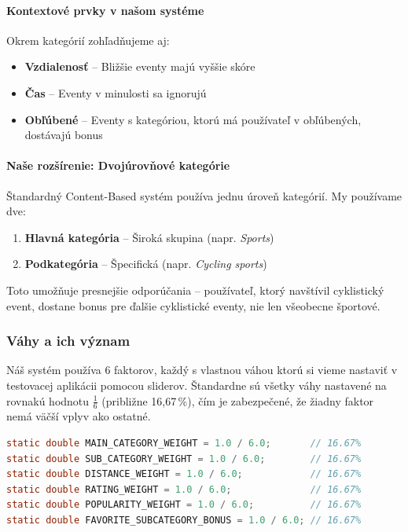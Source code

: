 \paragraph{Kontextové prvky v našom systéme}

Okrem kategórií zohľadňujeme aj:

\begin{itemize}
    \item \textbf{Vzdialenosť} -- Bližšie eventy majú vyššie skóre
    \item \textbf{Čas} -- Eventy v minulosti sa ignorujú
    \item \textbf{Obľúbené} -- Eventy s kategóriou, ktorú má používateľ v obľúbených, dostávajú bonus
\end{itemize}

\paragraph{Naše rozšírenie: Dvojúrovňové kategórie}

Štandardný Content-Based systém používa jednu úroveň kategórií. My používame dve:

\begin{enumerate}
    \item \textbf{Hlavná kategória} -- Široká skupina (napr. \textit{Sports})
    \item \textbf{Podkategória} -- Špecifická (napr. \textit{Cycling sports})
\end{enumerate}

Toto umožňuje presnejšie odporúčania -- používateľ, ktorý navštívil cyklistický event, dostane bonus pre ďalšie cyklistické eventy, nie len všeobecne športové.

\subsubsection{Váhy a ich význam}

Náš systém používa 6 faktorov, každý s vlastnou váhou ktorú si vieme nastaviť v testovacej aplikácii pomocou sliderov. Štandardne sú všetky váhy nastavené na rovnakú hodnotu $\frac{1}{6}$ (približne 16,67\,\%), čím je zabezpečené, že žiadny faktor nemá väčší vplyv ako ostatné.

\begin{lstlisting}[language=Java, caption=Definícia váh s defaultnými hodnotami]
static double MAIN_CATEGORY_WEIGHT = 1.0 / 6.0;       // 16.67%
static double SUB_CATEGORY_WEIGHT = 1.0 / 6.0;        // 16.67%
static double DISTANCE_WEIGHT = 1.0 / 6.0;            // 16.67%
static double RATING_WEIGHT = 1.0 / 6.0;              // 16.67%
static double POPULARITY_WEIGHT = 1.0 / 6.0;          // 16.67%
static double FAVORITE_SUBCATEGORY_BONUS = 1.0 / 6.0; // 16.67%
\end{lstlisting}

